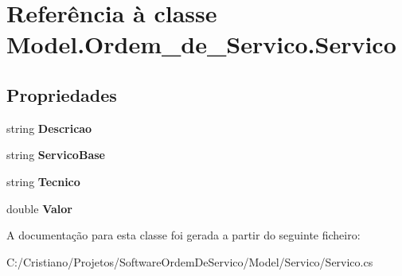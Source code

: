 \hypertarget{class_model_1_1_ordem__de___servico_1_1_servico}{}\section{Referência à classe Model.\+Ordem\+\_\+de\+\_\+\+Servico.\+Servico}
\label{class_model_1_1_ordem__de___servico_1_1_servico}
\subsection*{Propriedades}
\begin{DoxyCompactItemize}
\item 
\hypertarget{class_model_1_1_ordem__de___servico_1_1_servico_a094d3e4aa689cb0c8df45206b7f1a5fc}{}string {\bfseries Descricao}\label{class_model_1_1_ordem__de___servico_1_1_servico_a094d3e4aa689cb0c8df45206b7f1a5fc}

\item 
\hypertarget{class_model_1_1_ordem__de___servico_1_1_servico_a0d43f25134fbfc15ceb8fe835d866387}{}string {\bfseries Servico\+Base}\label{class_model_1_1_ordem__de___servico_1_1_servico_a0d43f25134fbfc15ceb8fe835d866387}

\item 
\hypertarget{class_model_1_1_ordem__de___servico_1_1_servico_a75ef84bc3a1fb49aa5891f1873578732}{}string {\bfseries Tecnico}\label{class_model_1_1_ordem__de___servico_1_1_servico_a75ef84bc3a1fb49aa5891f1873578732}

\item 
\hypertarget{class_model_1_1_ordem__de___servico_1_1_servico_a54366b1a10051d3df2084aaa14691643}{}double {\bfseries Valor}\label{class_model_1_1_ordem__de___servico_1_1_servico_a54366b1a10051d3df2084aaa14691643}

\end{DoxyCompactItemize}


A documentação para esta classe foi gerada a partir do seguinte ficheiro\+:\begin{DoxyCompactItemize}
\item 
C\+:/\+Cristiano/\+Projetos/\+Software\+Ordem\+De\+Servico/\+Model/\+Servico/Servico.\+cs\end{DoxyCompactItemize}
